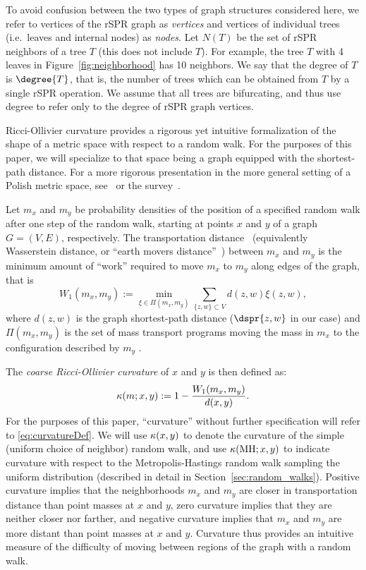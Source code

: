 \documentclass[11pt]{amsart}
\newcommand{\MH}{\operatorname{MH}}
\newcommand{\cuttable}[2][]{%
    \ifthenelse{\equal{#1}{}}%
		{}%
		{#1}%
}
\newcommand{\curvature}[2][]{%
    \ifthenelse{\equal{#1}{}}%
		{\kappa(#2)}%
		{\kappa_{#1}(#2)}%
}
\begin{document}
To avoid confusion between the two types of graph structures considered here, we refer to vertices of the rSPR graph as \emph{vertices} and vertices of individual trees (i.e.\ leaves and internal nodes) as \emph{nodes}.
Let $N(T)$ be the set of rSPR neighbors of a tree $T$ (this does not include $T$).
For example, the tree $T$ with 4 leaves in Figure~\ref{fig:neighborhood} has 10 neighbors.
We say that the degree of $T$ is $\degree{T}$, that is, the number of trees which can be obtained from $T$ by a single rSPR operation.
We assume that all trees are bifurcating, and thus use degree to refer only to the degree of rSPR graph vertices.

Ricci-Ollivier curvature provides a rigorous yet intuitive formalization of the shape of a metric space with respect to a random walk.
For the purposes of this paper, we will specialize to that space being a graph equipped with the shortest-path distance.
For a more rigorous presentation in the more general setting of a Polish metric space, see~\cite{Ollivier2009-bw} or the survey~\cite{Ollivier2010-ao}.

Let $m_x$ and $m_y$ be probability densities of the position of a specified random walk after one step of the random walk, starting at points $x$ and $y$ of a graph $G = (V,E)$, respectively.
The transportation distance~\cite{Villani2003-wv} (equivalently Wasserstein distance, or ``earth movers distance''~\cite{rubner2000earth}) between $m_x$ and $m_y$ is the minimum amount of ``work'' required to move $m_x$ to $m_y$ along edges of the graph, that is
$$ W_1(m_x, m_y) := \min_{\xi \in \Pi(m_x, m_y)} \sum_{\{z,w\} \subset V} d(z,w) \xi(z,w),$$
where $d(z,w)$ is the graph shortest-path distance ($\dspr{z,w}$ in our case) and $\Pi(m_x, m_y)$ is the set of mass transport programs moving the mass in $m_x$ to the configuration described by $m_y$\cuttable{ (more formally, a density on $V \times V$ which is $m_x$ after projecting on the first component and $m_y$ after projecting on the second)}.

The \emph{coarse Ricci-Ollivier curvature} of $x$ and $y$ is then defined as:
\begin{equation}
\curvature{m; x, y} := 1 - \frac{W_1(m_x, m_y)}{d(x, y)}.
\label{eq:curvatureDef}
\end{equation}
For the purposes of this paper, ``curvature'' without further specification will refer to \eqref{eq:curvatureDef}.
We will use $\curvature{x,y}$ to denote the curvature of the simple (uniform choice of neighbor) random walk, and use $\curvature{\MH; x,y}$ to indicate curvature with respect to the Metropolis-Hastings random walk sampling the uniform distribution (described in detail in Section~\ref{sec:random_walks}).
Positive curvature implies that the neighborhoods $m_x$ and $m_y$ are closer in transportation distance than point masses at $x$ and $y$, zero curvature implies that they are neither closer nor farther, and negative curvature implies that $m_x$ and $m_y$ are more distant than point masses at $x$ and $y$.
Curvature thus provides an intuitive measure of the difficulty of moving between regions of the graph with \cuttable[a]{the given} random walk.
\end{document}
